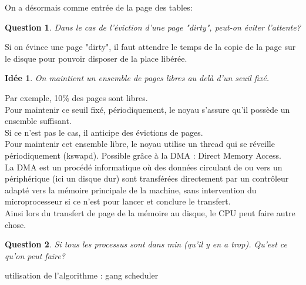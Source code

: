 \documentclass[12pt,a4paper]{report}
\newtheorem*{q}{Question}
\newtheorem*{id}{Idée}
\begin{document}
On a désormais comme entrée de la page des tables:\\
\begin{center}
\end{center}

\begin{q}Dans le cas de l'éviction d'une page "dirty", peut-on éviter l'attente?\end{q}
Si on évince une page "dirty", il faut attendre le temps de la copie de la page sur le disque pour pouvoir disposer de la place libérée.\\

\begin{id} On maintient un ensemble de pages libres au delà d'un seuil fixé.\end{id}
Par exemple, 10\% des pages sont libres.\\

Pour maintenir ce seuil fixé, périodiquement, le noyau s'assure qu'il possède un ensemble suffisant.\\
Si ce n'est pas le cas, il anticipe des évictions de pages.\\
Pour maintenir cet ensemble libre, le noyau utilise un thread qui se réveille périodiquement (kswapd). Possible grâce à la DMA : Direct Memory Access.\\

La DMA est un procédé informatique où des données circulant de ou vers un périphérique (ici un disque dur) sont transférées directement par un contrôleur adapté vers la mémoire principale de la machine, sans intervention du microprocesseur si ce n'est pour lancer et conclure le transfert.\\

Ainsi lors du transfert de page de la mémoire au disque, le CPU peut faire autre chose.\\

\begin{q}
Si tous les processus sont dans min (qu'il y en a trop). Qu'est ce qu'on peut faire?\end{q}
utilisation de l’algorithme : gang scheduler
\end{document}
